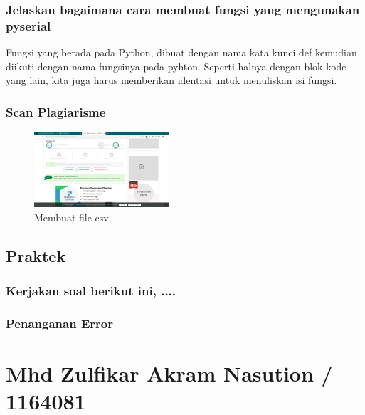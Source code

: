 \subsubsection{Jelaskan bagaimana cara membuat fungsi yang mengunakan pyserial}

\hfill \break
Fungsi yang berada pada Python, dibuat dengan nama kata kunci def kemudian diikuti dengan nama fungsinya pada pyhton.
Seperti halnya dengan blok kode yang lain, kita juga harus memberikan identasi untuk menuliskan isi fungsi.

\subsubsection{Scan Plagiarisme}
\begin{figure}[H] 
\includegraphics[width=5cm]{figures/5/Teori/1174038/nopla.png}
\centering
\caption{Membuat file csv}
\end{figure}

\subsection{Praktek}
\subsubsection{Kerjakan soal berikut ini, ....}
\subsubsection{Penanganan Error}

\section{Mhd Zulfikar Akram Nasution / 1164081}

